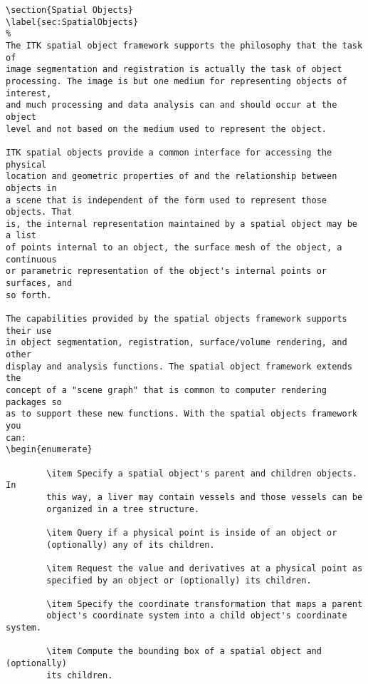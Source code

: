 \begin{verbatim}
\section{Spatial Objects}
\label{sec:SpatialObjects}
%
The ITK spatial object framework supports the philosophy that the task of
image segmentation and registration is actually the task of object
processing. The image is but one medium for representing objects of interest,
and much processing and data analysis can and should occur at the object
level and not based on the medium used to represent the object.

ITK spatial objects provide a common interface for accessing the physical
location and geometric properties of and the relationship between objects in
a scene that is independent of the form used to represent those objects. That
is, the internal representation maintained by a spatial object may be a list
of points internal to an object, the surface mesh of the object, a continuous
or parametric representation of the object's internal points or surfaces, and
so forth.

The capabilities provided by the spatial objects framework supports their use
in object segmentation, registration, surface/volume rendering, and other
display and analysis functions. The spatial object framework extends the
concept of a "scene graph" that is common to computer rendering packages so
as to support these new functions. With the spatial objects framework you
can:
\begin{enumerate}

        \item Specify a spatial object's parent and children objects.  In
        this way, a liver may contain vessels and those vessels can be
        organized in a tree structure.

        \item Query if a physical point is inside of an object or
        (optionally) any of its children.

        \item Request the value and derivatives at a physical point as
        specified by an object or (optionally) its children.

        \item Specify the coordinate transformation that maps a parent
        object's coordinate system into a child object's coordinate system.

        \item Compute the bounding box of a spatial object and (optionally)
        its children.


\end{verbatim}
